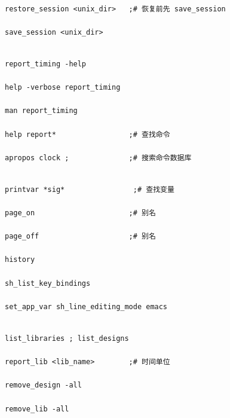 \begin{description}[leftmargin=2.4em,style=nextline]

  \item[会话]%

\begin{lstlisting}

restore_session <unix_dir>   ;# 恢复前先 save_session

save_session <unix_dir>

\end{lstlisting}

  \item[帮助]%

\begin{lstlisting}

report_timing -help

help -verbose report_timing

man report_timing

help report*                 ;# 查找命令

apropos clock ;              ;# 搜索命令数据库

\end{lstlisting}

  \item[环境与历史]%

\begin{lstlisting}

printvar *sig*                ;# 查找变量

page_on                      ;# 别名

page_off                     ;# 别名

history

sh_list_key_bindings

set_app_var sh_line_editing_mode emacs

\end{lstlisting}

  \item[设计与库]%

\begin{lstlisting}

list_libraries ; list_designs

report_lib <lib_name>        ;# 时间单位

remove_design -all

remove_lib -all

\end{lstlisting}

\end{description}



